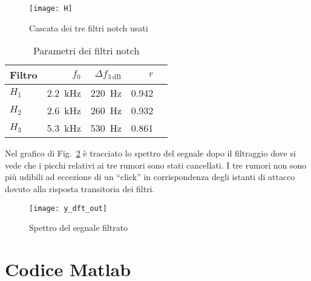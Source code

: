 \documentclass{article}
\newcommand{\includecode}[1]{}
\newcommand{\fig}[1]{Fig.~\ref{#1}}
\begin{document}
\begin{figure}[h]
  \centering
  \texttt{[image: H]}
  \caption{Cascata dei tre filtri notch usati}
  \label{plot:notch}
\end{figure}

\begin{table}[h]
  \centering
  \begin{tabular}{lrrrr}
    Filtro & $f_0$                 & $\Delta f_{\SI{3}{\dB}}$ & $r$    \\
    \hline
    $H_1$  & \SI{2.2}{\kilo\hertz} & \SI{220}{\hertz}     & 0.942 \\
    $H_2$  & \SI{2.6}{\kilo\hertz} & \SI{260}{\hertz}     & 0.932 \\
    $H_3$  & \SI{5.3}{\kilo\hertz} & \SI{530}{\hertz}     & 0.861 \\
  \end{tabular}
  \caption{Parametri dei filtri notch}
  \label{tab:notch}
\end{table}

Nel grafico di \fig{plot:y_dft_out} è tracciato lo spettro del segnale
dopo il filtraggio dove si vede che i picchi relativi ai tre rumori
sono stati cancellati. I tre rumori non sono più udibili ad eccezione
di un ``click'' in corrispondenza degli istanti di attacco dovuto alla
risposta transitoria dei filtri.

\begin{figure}[h]
  \centering
  \texttt{[image: y\_dft\_out]}
  \caption{Spettro del segnale filtrato}
  \label{plot:y_dft_out}
\end{figure}

\clearpage

\section{Codice Matlab}
\includecode{notch\string_filter.m}
\includecode{single\string_freq\string_filter.m}
\includecode{find\string_noise.m}
\includecode{find\string_noise\string_start.m}
\includecode{find\string_noise\string_amplitude.m}
\includecode{progetto.m}
\end{document}
